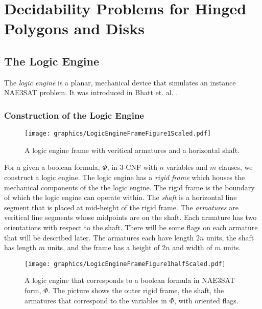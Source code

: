 \chapter{Decidability Problems for Hinged Polygons and Disks}
\section{The Logic Engine}
The \textit{logic engine} is a planar, mechanical device that simulates an instance NAE3SAT problem. It was introduced in Bhatt et. al. \cite{BC87}.
\subsection{Construction of the Logic Engine}

\begin{figure}[!h]
\begin{center}
\texttt{[image: graphics/LogicEngineFrameFigure1Scaled.pdf]}
\caption{A logic engine frame with veritical armatures and a horizontal shaft.}
\label{fig:LogicEngineFrameFigure1.pdf}
\end{center}
\end{figure}

For a given a boolean formula, $\Phi$, in 3-CNF with $n$ variables and $m$ clauses, we construct a logic engine. The logic engine has a \textit{rigid frame} which houses the mechanical components of the the logic engine.  The rigid frame is the boundary of which the logic engine can operate within.  The \textit{shaft} is a horizontal line segment that is placed at mid-height of the rigid frame. 
The \textit{armatures} are veritical line segments whose midpoints are on the shaft.  
Each armature has two orientations with respect to the shaft. 
There will be some flags on each armature that will be described later.
The armatures each have length $2n$ units, the shaft has length $m$ units, and the frame has a height of $2n$ and width of $m$ units.


\begin{figure}[!h]
\begin{center}
\texttt{[image: graphics/LogicEngineFrameFigure1halfScaled.pdf]}
\caption{A logic engine that corresponds to a boolean formula in NAE3SAT form, $\Phi$.  The picture shows the outer rigid frame, the shaft, the armatures that correspond to the variables in $\Phi$, with oriented flags.}\label{fig:LogicEngineFrameFigure1halfScaled.pdf}
\end{center}
\end{figure}

